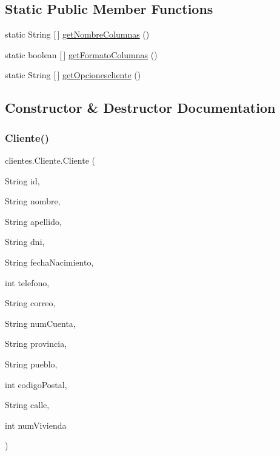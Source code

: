 \subsection*{Static Public Member Functions}
\begin{DoxyCompactItemize}
\item 
static String \mbox{[}$\,$\mbox{]} \mbox{\hyperlink{classclientes_1_1_cliente_aaedfb1a4a28af84fb0e22c75d0d9dfdd}{get\+Nombre\+Columnas}} ()
\item 
static boolean \mbox{[}$\,$\mbox{]} \mbox{\hyperlink{classclientes_1_1_cliente_a3e27faa4e105a87dad7a4dd3f01f2c4c}{get\+Formato\+Columnas}} ()
\item 
static String \mbox{[}$\,$\mbox{]} \mbox{\hyperlink{classclientes_1_1_cliente_ac66c36eb54668f7dead734827d61f75e}{get\+Opcionescliente}} ()
\end{DoxyCompactItemize}


\subsection{Constructor \& Destructor Documentation}
\mbox{\label{classclientes_1_1_cliente_a15501ae37e3b4370b2a73e9fb0581a23}} 
\subsubsection{\texorpdfstring{Cliente()}{Cliente()}}
{\footnotesize\ttfamily clientes.\+Cliente.\+Cliente (\begin{DoxyParamCaption}\item[{String}]{id,  }\item[{String}]{nombre,  }\item[{String}]{apellido,  }\item[{String}]{dni,  }\item[{String}]{fecha\+Nacimiento,  }\item[{int}]{telefono,  }\item[{String}]{correo,  }\item[{String}]{num\+Cuenta,  }\item[{String}]{provincia,  }\item[{String}]{pueblo,  }\item[{int}]{codigo\+Postal,  }\item[{String}]{calle,  }\item[{int}]{num\+Vivienda }\end{DoxyParamCaption})}

